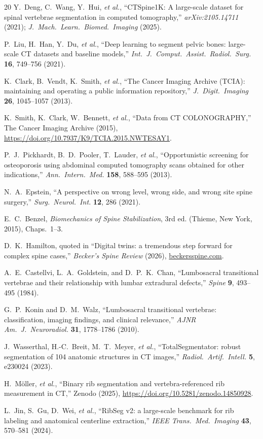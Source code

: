 \documentclass[aapm,mph,amsmath,amssymb,reprint,linenumbers]{revtex4-2}
\begin{document}
\begin{thebibliography}{20}
 Y.~Deng, C.~Wang, Y.~Hui, \emph{et al.}, ``CTSpine1K: A large-scale
dataset for spinal vertebrae segmentation in computed tomography,''
\emph{arXiv:2105.14711} (2021); \emph{J.~Mach.~Learn.~Biomed.~Imaging} (2025).

 P.~Liu, H.~Han, Y.~Du, \emph{et al.}, ``Deep learning to segment
pelvic bones: large-scale CT datasets and baseline models,''
\emph{Int.~J.~Comput.~Assist.~Radiol.~Surg.} \textbf{16}, 749--756 (2021).

 K.~Clark, B.~Vendt, K.~Smith, \emph{et al.}, ``The Cancer Imaging Archive
(TCIA): maintaining and operating a public information repository,''
\emph{J.~Digit.~Imaging} \textbf{26}, 1045--1057 (2013).

 K.~Smith, K.~Clark, W.~Bennett, \emph{et al.}, ``Data from CT
COLONOGRAPHY,'' The Cancer Imaging Archive (2015),
\url{https://doi.org/10.7937/K9/TCIA.2015.NWTESAY1}.

 P.~J.~Pickhardt, B.~D.~Pooler, T.~Lauder, \emph{et al.},
``Opportunistic screening for osteoporosis using abdominal computed tomography scans
obtained for other indications,'' \emph{Ann.~Intern.~Med.} \textbf{158}, 588--595 (2013).

 N.~A.~Epstein, ``A perspective on wrong level, wrong side, and
wrong site spine surgery,'' \emph{Surg.~Neurol.~Int.} \textbf{12}, 286 (2021).

 E.~C.~Benzel, \emph{Biomechanics of Spine Stabilization}, 3rd ed.
(Thieme, New York, 2015), Chaps.~1--3.

 D.~K.~Hamilton, quoted in ``Digital twins: a tremendous step forward
for complex spine cases,'' \emph{Becker's Spine Review} (2026), \url{beckersspine.com}.

 A.~E.~Castellvi, L.~A.~Goldstein, and D.~P.~K.~Chan, ``Lumbosacral
transitional vertebrae and their relationship with lumbar extradural defects,''
\emph{Spine} \textbf{9}, 493--495 (1984).

 G.~P.~Konin and D.~M.~Walz, ``Lumbosacral transitional vertebrae:
classification, imaging findings, and clinical relevance,''
\emph{AJNR Am.~J.~Neuroradiol.} \textbf{31}, 1778--1786 (2010).


 J.~Wasserthal, H.-C.~Breit, M.~T.~Meyer, \emph{et al.},
``TotalSegmentator: robust segmentation of 104 anatomic structures in CT images,''
\emph{Radiol.~Artif.~Intell.} \textbf{5}, e230024 (2023).

 H.~M\"oller, \emph{et al.}, ``Binary rib segmentation and
vertebra-referenced rib measurement in CT,'' Zenodo (2025),
\url{https://doi.org/10.5281/zenodo.14850928}. %

 L.~Jin, S.~Gu, D.~Wei, \emph{et al.}, ``RibSeg v2: a large-scale
benchmark for rib labeling and anatomical centerline extraction,''
\emph{IEEE Trans.~Med.~Imaging} \textbf{43}, 570--581 (2024).

\end{thebibliography}
\end{document}
